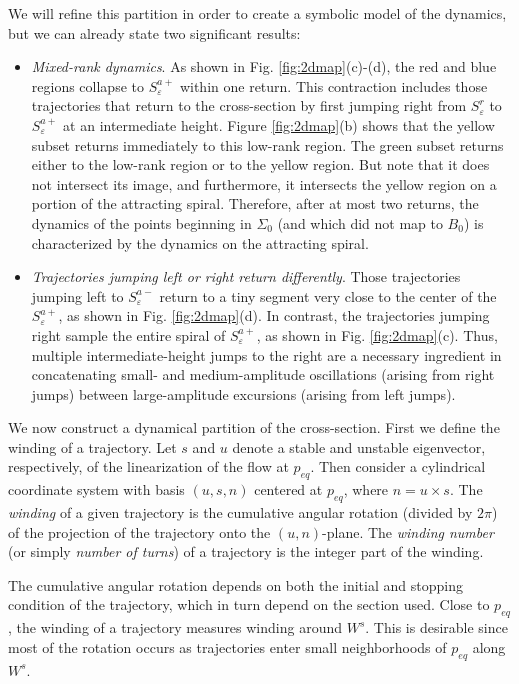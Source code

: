 \documentclass[aip, cha, sd, amsmath,amssymb, preprint]{revtex4-1}
\begin{document}
We will refine this partition in order to create a symbolic model of the dynamics, but we can already state two significant results: \begin{itemize}
\item {\it Mixed-rank dynamics}. As shown in Fig. \ref{fig:2dmap}(c)-(d), the red and blue regions collapse to $S^{a+}_{ \varepsilon}$ within one return. This contraction includes those trajectories that return to the cross-section by first jumping right from $S^r_{ \varepsilon}$ to $S^{a+}_{ \varepsilon}$ at an intermediate height. Figure \ref{fig:2dmap}(b) shows that the yellow subset returns immediately to this low-rank region. The green subset returns either to the low-rank region or to the yellow region. But note that it does not intersect its image, and furthermore, it intersects the yellow region on a portion of the attracting spiral. Therefore, after at most two returns, the dynamics of the points beginning in $\Sigma_0$ (and which did not map to $B_0$) is characterized by the dynamics on the attracting spiral.
\item {\it Trajectories jumping left or right return differently}. Those trajectories jumping left to $S^{a-}_{ \varepsilon}$ return to a tiny segment very close to the center of the $S^{a+}_{ \varepsilon}$, as shown in Fig. \ref{fig:2dmap}(d). In contrast, the trajectories jumping right sample the entire spiral of $S^{a+}_{ \varepsilon}$, as shown in Fig. \ref{fig:2dmap}(c). Thus, multiple intermediate-height jumps to the right are a necessary ingredient in concatenating small- and medium-amplitude oscillations (arising from right jumps) between large-amplitude excursions (arising from left jumps). 
\end{itemize}   

We now construct a dynamical partition of the cross-section. First we define the winding of a trajectory. Let $s$ and $u$ denote a stable and unstable eigenvector, respectively, of the linearization of the flow at $p_{eq}$. Then consider a cylindrical coordinate system with basis $(u,s,n)$ centered at $p_{eq}$, where $n = u \times s$. The {\it winding} of a given trajectory is the cumulative angular rotation (divided by $2\pi$) of the projection of the trajectory onto the $(u,n)$-plane. The {\it winding number} (or simply {\it number of turns}) of a trajectory is the integer part of the winding.

The cumulative angular rotation depends on both the initial and stopping condition of the trajectory, which in turn depend on the section used. Close to $p_{eq}$, the winding of a trajectory measures winding around $W^s$. This is desirable since most of the rotation occurs as trajectories enter small neighborhoods of $p_{eq}$ along $W^s$. 
\end{document}
